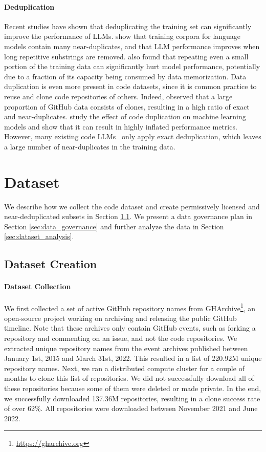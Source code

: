 \paragraph{Deduplication}
Recent studies have shown that deduplicating the training set can significantly improve the performance of LLMs. \citet{lee2021deduplicating} show that training corpora for language models contain many near-duplicates, and that LLM performance improves when long repetitive substrings are removed. \citet{hernandez2022scaling} also found that repeating even a small portion of the training data can significantly hurt model performance, potentially due to a fraction of its capacity being consumed by data memorization. Data duplication is even more present in code datasets, since it is common practice to reuse and clone code repositories of others. Indeed, \citet{lopes2017dejavu} observed that a large proportion of GitHub data consists of clones, resulting in a high ratio of exact and near-duplicates. \citet{allamanis2019duplication} study the effect of code duplication on machine learning models and show that it can result in highly inflated performance metrics. However,  many existing code LLMs~\citep{Nijkamp2022ACP,xu2022systematicevaluation,li2022competition} only apply exact deduplication, which leaves a large number of near-duplicates in the training data. 

\section{Dataset}
We describe how we collect the code dataset and create permissively licensed and near-deduplicated subsets in Section \ref{sec:dataset_creation}. We present a data governance plan in Section \ref{sec:data_governance} and further analyze the data in Section \ref{sec:dataset_analysis}. 

\subsection{Dataset Creation}\label{sec:dataset_creation}

\paragraph{Dataset Collection} We first collected a set of active GitHub repository names from GHArchive\footnote{\url{https://gharchive.org}}, an open-source project working on archiving and releasing the public GitHub timeline. Note that these archives only contain GitHub events, such as forking a repository and commenting on an issue, and not the code repositories. We extracted unique repository names from the event archives published between January 1st, 2015 and March 31st, 2022. This resulted in a list of 220.92M unique repository names. Next, we ran a distributed compute cluster for a couple of months to clone this list of repositories. We did not successfully download all of these repositories because some of them were deleted or made private. In the end, we successfully downloaded 137.36M repositories, resulting in a clone success rate of over 62\%. All repositories were downloaded between November 2021 and June 2022. 

